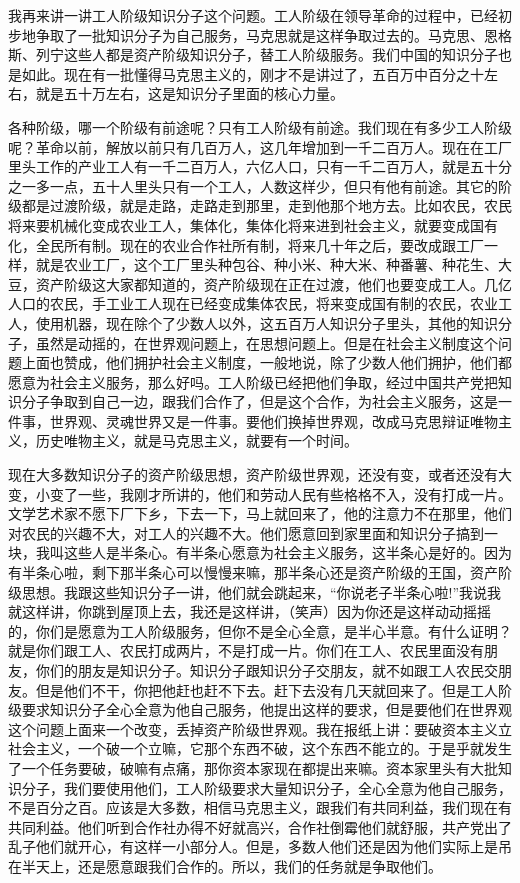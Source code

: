 我再来讲一讲工人阶级知识分子这个问题。工人阶级在领导革命的过程中，已经初步地争取了一批知识分子为自己服务，马克思就是这样争取过去的。马克思、恩格斯、列宁这些人都是资产阶级知识分子，替工人阶级服务。我们中国的知识分子也是如此。现在有一批懂得马克思主义的，刚才不是讲过了，五百万中百分之十左右，就是五十万左右，这是知识分子里面的核心力量。

各种阶级，哪一个阶级有前途呢？只有工人阶级有前途。我们现在有多少工人阶级呢？革命以前，解放以前只有几百万人，这几年增加到一千二百万人。现在在工厂里头工作的产业工人有一千二百万人，六亿人口，只有一千二百万人，就是五十分之一多一点，五十人里头只有一个工人，人数这样少，但只有他有前途。其它的阶级都是过渡阶级，就是走路，走路走到那里，走到他那个地方去。比如农民，农民将来要机械化变成农业工人，集体化，集体化将来进到社会主义，就要变成国有化，全民所有制。现在的农业合作社所有制，将来几十年之后，要改成跟工厂一样，就是农业工厂，这个工厂里头种包谷、种小米、种大米、种番薯、种花生、大豆，资产阶级这大家都知道的，资产阶级现在正在过渡，他们也要变成工人。几亿人口的农民，手工业工人现在已经变成集体农民，将来变成国有制的农民，农业工人，使用机器，现在除个了少数人以外，这五百万人知识分子里头，其他的知识分子，虽然是动摇的，在世界观问题上，在思想问题上。但是在社会主义制度这个问题上面也赞成，他们拥护社会主义制度，一般地说，除了少数人他们拥护，他们都愿意为社会主义服务，那么好吗。工人阶级已经把他们争取，经过中国共产党把知识分子争取到自己一边，跟我们合作了，但是这个合作，为社会主义服务，这是一件事，世界观、灵魂世界又是一件事。要他们换掉世界观，改成马克思辩证唯物主义，历史唯物主义，就是马克思主义，就要有一个时间。

现在大多数知识分子的资产阶级思想，资产阶级世界观，还没有变，或者还没有大变，小变了一些，我刚才所讲的，他们和劳动人民有些格格不入，没有打成一片。文学艺术家不愿下厂下乡，下去一下，马上就回来了，他的注意力不在那里，他们对农民的兴趣不大，对工人的兴趣不大。他们愿意回到家里面和知识分子搞到一块，我叫这些人是半条心。有半条心愿意为社会主义服务，这半条心是好的。因为有半条心啦，剩下那半条心可以慢慢来嘛，那半条心还是资产阶级的王国，资产阶级思想。我跟这些知识分子一讲，他们就会跳起来，“你说老子半条心啦!”我说我就这样讲，你跳到屋顶上去，我还是这样讲，（笑声）因为你还是这样动动摇摇的，你们是愿意为工人阶级服务，但你不是全心全意，是半心半意。有什么证明？就是你们跟工人、农民打成两片，不是打成一片。你们在工人、农民里面没有朋友，你们的朋友是知识分子。知识分子跟知识分子交朋友，就不如跟工人农民交朋友。但是他们不干，你把他赶也赶不下去。赶下去没有几天就回来了。但是工人阶级要求知识分子全心全意为他自己服务，他提出这样的要求，但是要他们在世界观这个问题上面来一个改变，丢掉资产阶级世界观。我在报纸上讲：要破资本主义立社会主义，一个破一个立嘛，它那个东西不破，这个东西不能立的。于是乎就发生了一个任务要破，破嘛有点痛，那你资本家现在都提出来嘛。资本家里头有大批知识分子，我们要使用他们，工人阶级要求大量知识分子，全心全意为他自己服务，不是百分之百。应该是大多数，相信马克思主义，跟我们有共同利益，我们现在有共同利益。他们听到合作社办得不好就高兴，合作社倒霉他们就舒服，共产党出了乱子他们就开心，有这样一小部分人。但是，多数人他们还是因为他们实际上是吊在半天上，还是愿意跟我们合作的。所以，我们的任务就是争取他们。

